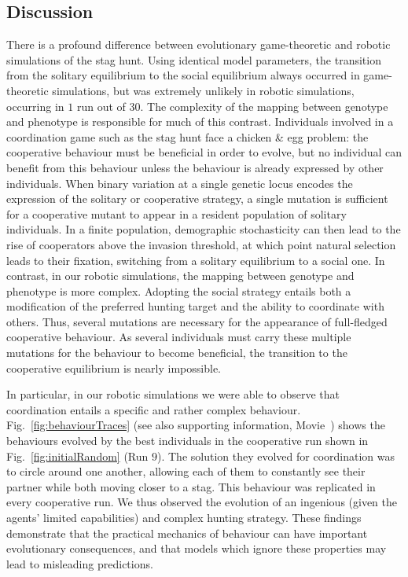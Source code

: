   \subsection{Discussion}
  \label{discussion}
    There is a profound difference between evolutionary game-theoretic and robotic simulations of the stag hunt. Using identical model parameters, the transition from the solitary equilibrium to the social equilibrium always occurred in game-theoretic simulations, but was extremely unlikely in robotic simulations, occurring in $1$ run out of $30$. The complexity of the mapping between genotype and phenotype is responsible for much of this contrast. Individuals involved in a coordination game such as the stag hunt face a chicken \& egg problem: the cooperative behaviour must be beneficial in order to evolve, but no individual can benefit from this behaviour unless the behaviour is already expressed by other individuals. When binary variation at a single genetic locus encodes the expression of the solitary or cooperative strategy, a single mutation is sufficient for a cooperative mutant to appear in a resident population of solitary individuals. In a finite population, demographic stochasticity can then lead to the rise of cooperators above the invasion threshold, at which point natural selection leads to their fixation, switching from a solitary equilibrium to a social one. In contrast, in our robotic simulations, the mapping between genotype and phenotype is more complex. Adopting the social strategy entails both a modification of the preferred hunting target and the ability to coordinate with others. Thus, several mutations are necessary for the appearance of full-fledged cooperative behaviour. As several individuals must carry these multiple mutations for the behaviour to become beneficial, the transition to the cooperative equilibrium is nearly impossible.

    In particular, in our robotic simulations we were able to observe that coordination entails a specific and rather complex behaviour. Fig.~\ref{fig:behaviourTraces} (see also supporting information, Movie~) shows the behaviours evolved by the best individuals in the cooperative run shown in Fig.~\ref{fig:initialRandom} (Run $9$). The solution they evolved for coordination was to circle around one another, allowing each of them to constantly see their partner while both moving closer to a stag. This behaviour was replicated in every cooperative run. We thus observed the evolution of an ingenious (given the agents' limited capabilities) and complex hunting strategy. These findings demonstrate that the practical mechanics of behaviour can have important evolutionary consequences, and that models which ignore these properties may lead to misleading predictions.


